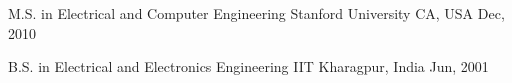 

\begin{cventries}

  \cventryNoDescription
    {M.S. in Electrical and Computer Engineering} %
    {Stanford University} %
    {CA, USA} %
    {Dec, 2010} %
  
  \cventryNoDescription
    {B.S. in Electrical and Electronics Engineering} %
    {IIT} %
    {Kharagpur, India} %
    {Jun, 2001} %


\end{cventries}
